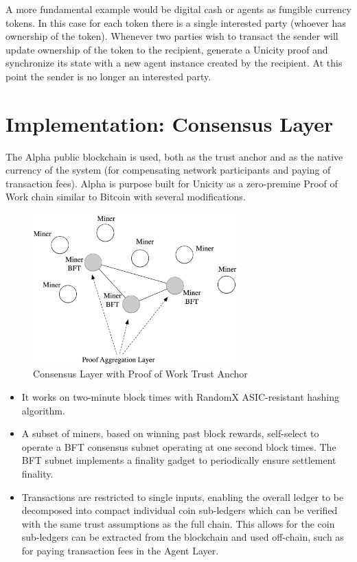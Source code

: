 \documentclass{article}
\begin{document}
\vspace{2mm}

 A more fundamental example would be digital cash or agents as fungible currency tokens. In this case for each token there is a single interested party (whoever has ownership of the token). Whenever two parties wish to transact the sender will update ownership of the token to the recipient, generate a Unicity proof and synchronize its state with a new agent instance created by the recipient. At this point the sender is no longer an interested party. 


\section{Implementation: Consensus Layer}

The Alpha public blockchain is used, both as the trust anchor and as the native currency of the system (for compensating network participants and paying of transaction fees). Alpha is purpose built for Unicity as a zero-premine Proof of Work chain similar to Bitcoin with several modifications.

\begin{figure}[htbp]
    \centering
    \includegraphics[width=0.7\textwidth]{Miners.png}
    \caption{Consensus Layer with Proof of Work Trust Anchor}
    \label{fig:miners}
\end{figure}

\begin{itemize}
\setlength{\leftmargin}{1em}
 \item It works on two-minute block times with RandomX ASIC-resistant hashing algorithm. 
 \item A subset of miners, based on winning past block rewards, self-select to operate a BFT consensus subnet operating at one second block times. The BFT subnet implements a finality gadget to periodically ensure settlement finality.
 \item Transactions are restricted to single inputs, enabling the overall ledger to be decomposed into compact individual coin sub-ledgers which can be verified with the same trust assumptions as the full chain.  This allows for the coin sub-ledgers can be extracted from the blockchain and used off-chain, such as for paying transaction fees in the Agent Layer.
\end{itemize}
\end{document}
